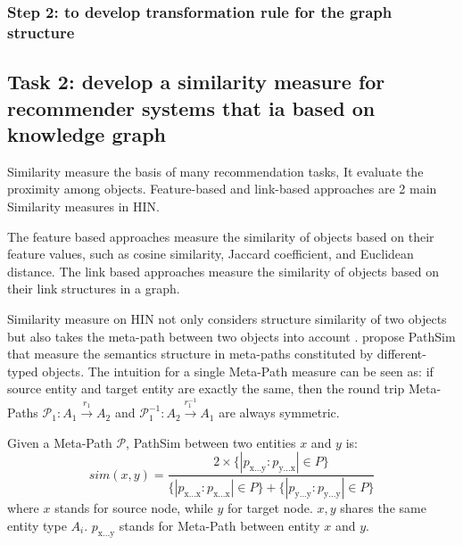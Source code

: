 

\subsubsection*{Step 2: to develop transformation rule for the graph structure}




\subsection{Task 2: develop a similarity measure for recommender systems that ia based on knowledge graph}

Similarity measure the basis of many recommendation tasks, It evaluate the proximity among objects. Feature-based and link-based approaches are 2 main Similarity measures in HIN. 

The feature based approaches measure the similarity of objects based on their feature values, such as cosine similarity, Jaccard coefficient, and Euclidean distance. The link based approaches measure the similarity of objects based on their link structures in a graph. 

Similarity measure on HIN not only considers structure similarity of two objects but also takes the meta-path between two objects into account \citep{Shi2017}. \citet{Sun2011PathSim} propose PathSim that measure the semantics structure in meta-paths constituted by different-typed objects. The intuition for a single Meta-Path measure can be seen as: if source entity and target entity are exactly the same, then the round trip Meta-Paths $\mathcal{P}_1: A_1 \xrightarrow{r_1} A_2$ and 
$\mathcal{P}_1^{-1}: A_2 \xrightarrow{r_1^{-1}} A_1$ are always symmetric.

\theoremstyle{definition}
\begin{definition}\label{def:pathsim}
    Given a Meta-Path $\mathcal{P}$, PathSim between two entities $x$ and $y$ is:
    \begin{equation}
        sim(x,y)=\frac{2 \times \{|p_\text{x...y}:p_\text{y...x}| \in P\}}{\{|p_\text{x...x}:p_\text{x...x}| \in P\} + \{|p_\text{y...y}:p_\text{y...y}| \in P\}}
    \end{equation}
    where $x$ stands for source node, while $y$ for target node. 
    $x, y$ shares the same entity type $A_i$.
    $p_\text{x...y}$ stands for Meta-Path between entity $x$ and $y$. 
\end{definition}


